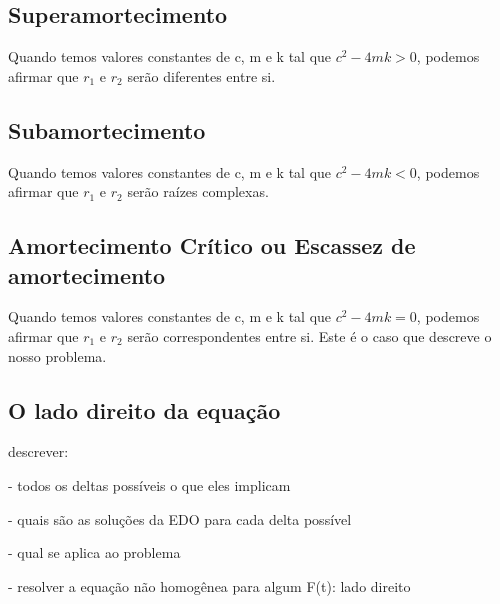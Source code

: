\documentclass[]{article}
\begin{document}
\subsection{Superamortecimento}

Quando temos valores constantes de c, m e k tal que $c^2 - 4mk > 0$, podemos afirmar que 
$r_1$ e $r_2$ serão diferentes entre si. 

\subsection{Subamortecimento}

Quando temos valores constantes de c, m e k tal que $c^2 - 4mk < 0$, podemos afirmar que 
$r_1$ e $r_2$ serão raízes complexas.

\subsection{Amortecimento Crítico ou Escassez de amortecimento}

Quando temos valores constantes de c, m e k tal que $c^2 - 4mk = 0$, podemos afirmar que 
$r_1$ e $r_2$ serão correspondentes entre si. Este é o caso que descreve o nosso problema.



\subsection{O lado direito da equação}

\vspace*{0.8cm}
descrever:

- todos os deltas possíveis o que eles implicam

- quais são as soluções da EDO para cada delta possível

- qual se aplica ao problema

- resolver a equação não homogênea para algum F(t): lado direito
\end{document}
